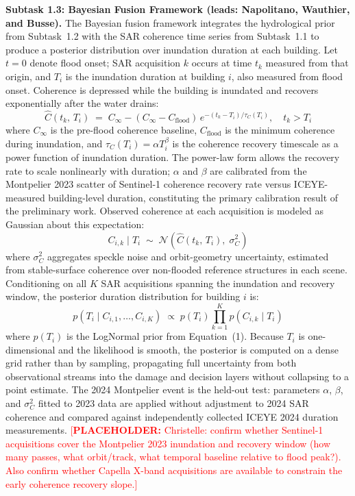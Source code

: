 \documentclass[11pt]{article}
\newcommand{\placeholder}[1]{\textcolor{red}{[\textbf{PLACEHOLDER:} #1]}}
\begin{document}
\textbf{Subtask 1.3: Bayesian Fusion Framework (leads: Napolitano, Wauthier, and Busse).}
The Bayesian fusion framework integrates the hydrological prior from Subtask~1.2 with the SAR coherence time series from Subtask~1.1 to produce a posterior distribution over inundation duration at each building.
Let $t = 0$ denote flood onset; SAR acquisition $k$ occurs at time $t_k$ measured from that origin, and $T_i$ is the inundation duration at building $i$, also measured from flood onset.
Coherence is depressed while the building is inundated and recovers exponentially after the water drains:
\begin{equation}
  \hat{C}(t_k,\, T_i) \;=\; C_\infty - (C_\infty - C_{\mathrm{flood}})\, e^{-(t_k - T_i)/\tau_C(T_i)}, \quad t_k > T_i
\end{equation}
where $C_\infty$ is the pre-flood coherence baseline, $C_{\mathrm{flood}}$ is the minimum coherence during inundation, and $\tau_C(T_i) = \alpha T_i^\beta$ is the coherence recovery timescale as a power function of inundation duration.
The power-law form allows the recovery rate to scale nonlinearly with duration; $\alpha$ and $\beta$ are calibrated from the Montpelier 2023 scatter of Sentinel-1 coherence recovery rate versus ICEYE-measured building-level duration, constituting the primary calibration result of the preliminary work.
Observed coherence at each acquisition is modeled as Gaussian about this expectation:
\begin{equation}
  C_{i,k} \mid T_i \;\sim\; \mathcal{N}\!\left(\hat{C}(t_k,\, T_i),\; \sigma_C^2\right)
\end{equation}
where $\sigma_C^2$ aggregates speckle noise and orbit-geometry uncertainty, estimated from stable-surface coherence over non-flooded reference structures in each scene.
Conditioning on all $K$ SAR acquisitions spanning the inundation and recovery window, the posterior duration distribution for building $i$ is:
\begin{equation}
  p(T_i \mid C_{i,1}, \ldots, C_{i,K}) \;\propto\; p(T_i) \prod_{k=1}^{K} p(C_{i,k} \mid T_i)
\end{equation}
where $p(T_i)$ is the LogNormal prior from Equation~(1).
Because $T_i$ is one-dimensional and the likelihood is smooth, the posterior is computed on a dense grid rather than by sampling, propagating full uncertainty from both observational streams into the damage and decision layers without collapsing to a point estimate.
The 2024 Montpelier event is the held-out test: parameters $\alpha$, $\beta$, and $\sigma_C^2$ fitted to 2023 data are applied without adjustment to 2024 SAR coherence and compared against independently collected ICEYE 2024 duration measurements.
\placeholder{Christelle: confirm whether Sentinel-1 acquisitions cover the Montpelier 2023 inundation and recovery window (how many passes, what orbit/track, what temporal baseline relative to flood peak?). Also confirm whether Capella X-band acquisitions are available to constrain the early coherence recovery slope.}
\end{document}

